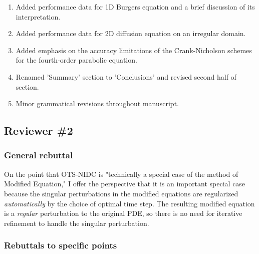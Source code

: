\documentclass[12pt]{article}
\begin{document}
\begin{enumerate}
\item Added performance data for 1D Burgers equation and a brief discussion of
      its interpretation.

\item Added performance data for 2D diffusion equation on an irregular domain.

\item Added emphasis on the accuracy limitations of the Crank-Nicholson schemes
      for the fourth-order parabolic equation.

\item Renamed 'Summary' section to 'Conclusions' and revised second half of
      section.

\item Minor grammatical revisions throughout manuscript.

\end{enumerate}

\subsection*{Reviewer \#2}

\subsubsection*{General rebuttal}

On the point that OTS-NIDC is "technically a special case of the method of
Modified Equation," I offer the perspective that it is an important special
case because the singular perturbations in the modified equations are
regularized \emph{automatically} by the choice of optimal time step.  The
resulting modified equation is a \emph{regular} perturbation to the original
PDE, so there is no need for iterative refinement to handle the singular
perturbation.

\subsubsection*{Rebuttals to specific points}
\end{document}
